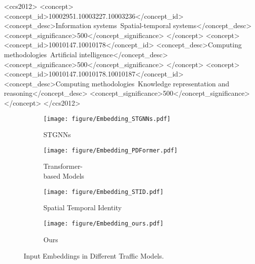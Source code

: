 \documentclass[sigconf]{acmart}
\begin{document}
\begin{CCSXML}
<ccs2012>
<concept>
    <concept_id>10002951.10003227.10003236</concept_id>
    <concept_desc>Information systems~Spatial-temporal systems</concept_desc>
    <concept_significance>500</concept_significance>
    </concept>
    <concept>
	<concept_id>10010147.10010178</concept_id>
	<concept_desc>Computing methodologies~Artificial intelligence</concept_desc>
	<concept_significance>500</concept_significance>
    </concept>
    <concept>
       <concept_id>10010147.10010178.10010187</concept_id>
       <concept_desc>Computing methodologies~Knowledge representation and reasoning</concept_desc>
       <concept_significance>500</concept_significance>
    </concept>
</ccs2012>
\end{CCSXML}




\maketitle

\begin{figure}[!t]
    \centering
    \begin{subfigure}[t]{0.192\linewidth}
        \centering
    \texttt{[image: figure/Embedding\_STGNNs.pdf]}
        \caption{STGNNs}
        \label{fig: embedding_STGNNs}
    \end{subfigure}
        \begin{subfigure}[t]{0.30\linewidth}
        \centering
        \texttt{[image: figure/Embedding\_PDFormer.pdf]}
        \caption{Transformer-\\based Models}
        \label{fig: embedding_PDFormer}
    \end{subfigure}
    \begin{subfigure}[t]{0.23\linewidth}
        \centering
        \texttt{[image: figure/Embedding\_STID.pdf]}
        \caption{Spatial Temporal Identity}
        \label{fig: embedding_STID}
    \end{subfigure}
    \label{fig: embeddings}
    \begin{subfigure}[t]{0.23\linewidth}
        \centering
        \texttt{[image: figure/Embedding\_ours.pdf]}
        \caption{Ours}
        \label{fig: embedding_ours}
    \end{subfigure}
    \caption{Input Embeddings in Different Traffic Models.}
    \label{fig: model_embeddings}
\end{figure}
\end{document}
